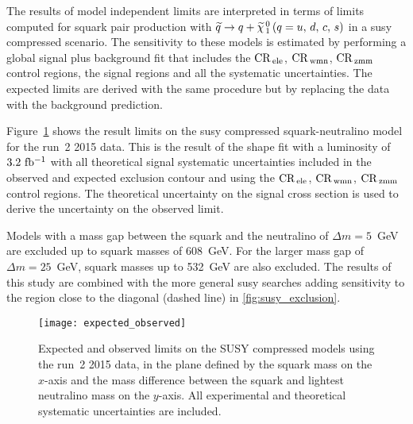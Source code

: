 The results of model independent limits are interpreted in terms of limits
computed for squark pair production with $\widetilde{q} \rightarrow q + \widetilde{\chi}_{\, 1}^{\, 0}\, (q = u,\, d,\, c,\, s)$ in a \gls{susy}
compressed scenario. The sensitivity to these models is estimated by performing
a global signal plus background fit that includes the $\mathrm{CR}_\mathrm{\, ele}$, $\mathrm{CR}_\mathrm{\, wmn}$,
$\mathrm{CR}_\mathrm{\, zmm}$ control regions, the signal regions and all the systematic
uncertainties. The expected limits are derived with the same procedure but by
replacing the data with the background prediction.

Figure~\ref{fig:expected_observed} shows the result limits on the \gls{susy}
compressed squark-neutralino model for the run~2 2015 data. This is the result
of the shape fit with a luminosity of $3.2~\mbox{fb$^{-1}$}$ with all theoretical signal
systematic uncertainties included in the observed and expected exclusion contour
and using the $\mathrm{CR}_\mathrm{\, ele}$, $\mathrm{CR}_\mathrm{\, wmn}$, $\mathrm{CR}_\mathrm{\, zmm}$ control regions. The theoretical
uncertainty on the signal cross section is used to derive the uncertainty on the
observed limit.

Models with a mass gap between the squark and the neutralino of
$\Delta m = 5$~GeV are excluded up to squark masses of 608~GeV. For the larger
mass gap of $\Delta m = 25$~GeV, squark masses up to 532~GeV are also
excluded. The results of this study are combined with the more general
\gls{susy} searches adding sensitivity to the region close to the diagonal
(dashed line) in \cref{fig:susy_exclusion}.
\begin{figure}[!htb]
  \centering
    \texttt{[image: expected\_observed]}
    \caption{Expected and observed limits on the SUSY compressed models using
      the run~2 2015 data, in the plane defined by the squark mass on the
      $x$-axis and the mass difference between the squark and lightest
      neutralino mass on the $y$-axis. All experimental and theoretical
      systematic uncertainties are included.}
    \label{fig:expected_observed}
\end{figure}
